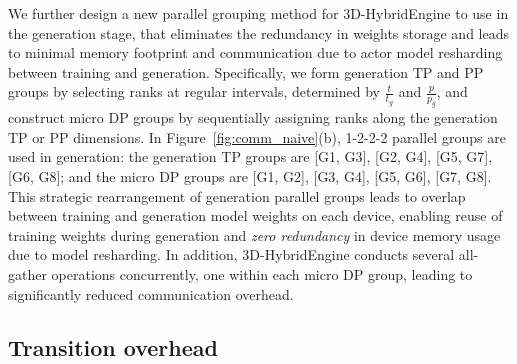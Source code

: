 We further design a new parallel grouping method for 3D-HybridEngine to use in the generation stage, that eliminates the redundancy in weights storage and leads to minimal memory footprint and communication due to actor model resharding between training and generation. %
Specifically, we form generation TP and PP groups by selecting ranks at regular intervals, determined by $\frac{t}{t_g}$ and $\frac{p}{p_g}$, and construct micro DP groups by sequentially assigning ranks along the generation TP or PP dimensions.
In Figure~\ref{fig:comm_naive}(b), 1-2-2-2 parallel groups are used in generation: the generation TP groups are [G1, G3], [G2, G4], [G5, G7], [G6, G8]; %
and the micro DP groups are [G1, G2], [G3, G4], [G5, G6], [G7, G8].
This strategic rearrangement of generation parallel groups leads to overlap between training and generation model weights on each device, enabling reuse of training weights during generation and
\textit{zero redundancy} in device memory usage due to model resharding. In addition, 3D-HybridEngine conducts several all-gather operations concurrently, one within each micro DP group, leading to significantly reduced 
communication overhead.






\begin{table}
\caption{%
Transition overhead between training \& generation
}
\vspace{-2mm}
\label{tab:comm_mem_analysis}
\vspace{-3mm}
\end{table}
\subsection{Transition overhead} \label{sec:hybrid_comm_mem}


